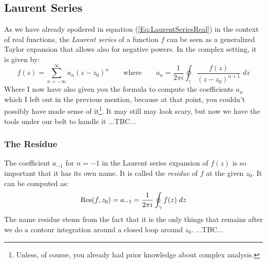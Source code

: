 


\subsection{Laurent Series}
As we have already spoilered in equation (\ref{Eq:LaurentSeriesReal}) in the context of real functions, the \emph{Laurent series} of a function $f$ can be seen as a generalized Taylor expansion that allows also for negative powers. In the complex setting, it is given by:
\begin{equation}
f(z) = \sum_{n=-\infty}^{\infty} a_n (z - z_0)^n 
\qquad \text{where} \qquad
a_n = \frac{1}{2 \pi i} \oint_{\gamma} \frac{f(z)}{(z-z_0)^{n+1}} \; dz
\end{equation}
Where I now have also given you the formula to compute the coefficients $a_n$ which I left out in the previous mention, because at that point, you couldn't possibly have made sense of it\footnote{Unless, of course, you already had prior knowledge about complex analysis.}. It may still may look scary, but now we have the tools under our belt to handle it ...TBC...



\subsubsection{The Residue}
The coefficient $a_{-1}$ for $n=-1$ in the Laurent series expansion of $f(z)$ is so important that it has its own name. It is called the \emph{residue} of $f$ at the given $z_0$. It can be computed as:
\begin{equation}
\operatorname{Res}(f,z_0) = a_{-1} = \frac{1}{2 \pi i} \oint_{\gamma} f(z) \; dz
\end{equation}
The name residue stems from the fact that it is the only things that remains after we do a contour integration around a closed loop around $z_0$. ...TBC...




